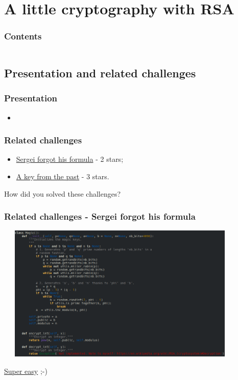 \documentclass[]{beamer}
\begin{document}
 

 
 

 
%
%
\section{A little cryptography with RSA}
\begin{frame}
    \frametitle{Contents}
    \begin{columns}[t]
        \begin{column}{5cm}
            \tableofcontents[sections={1-2}, currentsection, hideothersubsections]
        \end{column}
        \begin{column}{5cm}
            \tableofcontents[sections={3-4}, currentsection, hideothersubsections]
        \end{column}
    \end{columns}
\end{frame}
\subsection{Presentation and related challenges}
\begin{frame}
\frametitle{Presentation}
\begin{itemize}
    \item
\end{itemize}
\end{frame}

\begin{frame}
\frametitle{Related challenges}
\begin{itemize}
    \item \href{https://github.com/cscluxembourg/vestatech/blob/master/challenges/Sergei_forgot_his_formula/wip.py}{Sergei forgot his formula} - 2 stars;
    \item \href{https://github.com/cscluxembourg/vestatech/tree/master/challenges/A_key_from_the_past}{A key from the past} - 3 stars.
\end{itemize}
\bigskip
How did you solved these challenges?
\end{frame}

\begin{frame}
\frametitle{Related challenges - Sergei forgot his formula}
\begin{center}
    \includegraphics[height=6.5cm, width=12.0cm]{./images/RSA-algo-key-generation.png}
\end{center}
\href{https://en.wikipedia.org/wiki/RSA_(cryptosystem)\#Decryption}{Super easy} ;-)
\end{frame}
\end{document}
